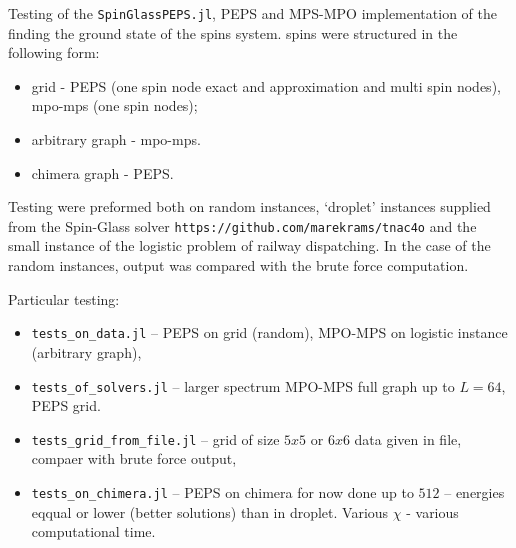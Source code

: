 \documentclass[11pt, a4paper, oneside]{article}
\date{}
\begin{document}
	
Testing of the \texttt{SpinGlassPEPS.jl}, PEPS and MPS-MPO implementation of 
the finding the ground state of the spins system. spins were structured in the 
following form:
\begin{itemize}
	\item grid - PEPS (one spin node exact and approximation and multi spin 
	nodes), mpo-mps (one spin nodes);
	\item arbitrary graph - mpo-mps.
	\item chimera graph - PEPS.
\end{itemize}
Testing were preformed both on random instances, `droplet' instances supplied 
from the Spin-Glass solver 
\texttt{https://github.com/marekrams/tnac4o}
and the small instance of the logistic problem of railway 
dispatching. In the case of the random instances, output was compared with the 
brute force computation. 

Particular testing:
\begin{itemize}
	\item \texttt{tests\_on\_data.jl} -- PEPS on grid (random), MPO-MPS on 
	logistic instance (arbitrary graph),
	\item \texttt{tests\_of\_solvers.jl} -- larger spectrum MPO-MPS full graph 
	up to $L = 64$, PEPS grid.
	\item \texttt{tests\_grid\_from\_file.jl} -- grid of size $5x5$ or $6x6$ 
	data given in file, compaer with brute force output,
	\item \texttt{tests\_on\_chimera.jl} -- PEPS on chimera for now done up to 
	$512$ -- energies eqqual or lower (better solutions) than in droplet. 
	Various $\chi$ - various computational time.
\end{itemize}
\end{document}
